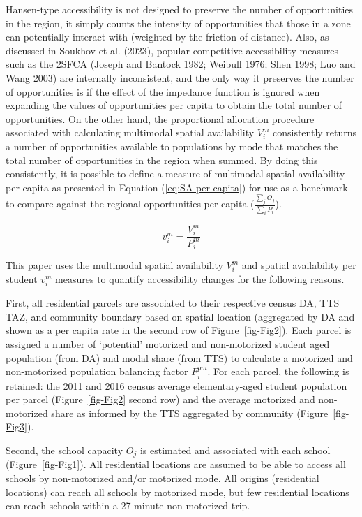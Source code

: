 \documentclass[
default
]{sn-jnl}
\begin{document}
Hansen-type accessibility is not designed to preserve the number of
opportunities in the region, it simply counts the intensity of
opportunities that those in a zone can potentially interact with
(weighted by the friction of distance). Also, as discussed in Soukhov et
al. (2023), popular competitive accessibility measures such as the 2SFCA
(Joseph and Bantock 1982; Weibull 1976; Shen 1998; Luo and Wang 2003)
are internally inconsistent, and the only way it preserves the number of
opportunities is if the effect of the impedance function is ignored when
expanding the values of opportunities per capita to obtain the total
number of opportunities. On the other hand, the proportional allocation
procedure associated with calculating multimodal spatial availability
\(V_i^m\) consistently returns a number of opportunities available to
populations by mode that matches the total number of opportunities in
the region when summed. By doing this consistently, it is possible to
define a measure of multimodal spatial availability per capita as
presented in Equation (\ref{eq:SA-per-capita}) for use as a benchmark to
compare against the regional opportunities per capita
(\(\frac{\sum_{j} O_j}{\sum_{i} P_i}\)).

\begin{equation}
\label{eq:SA-per-capita}
v_i^m = \frac{V_i^m}{P_i^m}
\end{equation}

This paper uses the multimodal spatial availability \(V_i^m\) and
spatial availability per student \(v_i^m\) measures to quantify
accessibility changes for the following reasons.

First, all residential parcels are associated to their respective census
DA, TTS TAZ, and community boundary based on spatial location
(aggregated by DA and shown as a per capita rate in the second row of
Figure~\ref{fig-Fig2}). Each parcel is assigned a number of `potential'
motorized and non-motorized student aged population (from DA) and modal
share (from TTS) to calculate a motorized and non-motorized population
balancing factor \(F_{i}^{pm}\). For each parcel, the following is
retained: the 2011 and 2016 census average elementary-aged student
population per parcel (Figure~\ref{fig-Fig2} second row) and the average
motorized and non-motorized share as informed by the TTS aggregated by
community (Figure~\ref{fig-Fig3}).

Second, the school capacity \(O_j\) is estimated and associated with
each school (Figure~\ref{fig-Fig1}). All residential locations are
assumed to be able to access all schools by non-motorized and/or
motorized mode. All origins (residential locations) can reach all
schools by motorized mode, but few residential locations can reach
schools within a 27 minute non-motorized trip.
\end{document}
